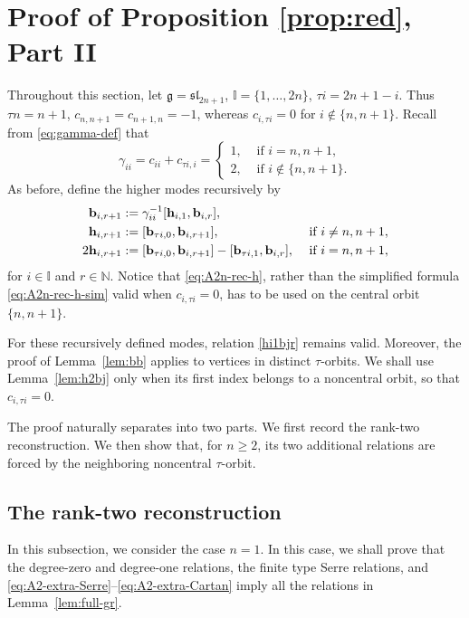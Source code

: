 \documentclass[11pt,reqno]{amsart}
\numberwithin{equation}{section}
\theoremstyle{definition}
\theoremstyle{remark}
\newcommand{\bN}{\mathbb{N}}
\newcommand{\bb}{\mathbf{b}}
\newcommand{\bh}{\mathbf{h}}
\newcommand{\g}{\mathfrak{g}}
\newcommand{\gge}{\geqslant}
\newcommand{\I}{{\mathbb I}}
\begin{document}
\section{Proof of Proposition \ref{prop:red}, Part II}\label{sec:pf-prop2}
Throughout this section, let $\g=\mathfrak{sl}_{2n+1}$, $\I=\{1,\ldots,2n\}$, $\tau i=2n+1-i$. Thus $\tau n=n+1$, $c_{n,n+1}=c_{n+1,n}=-1$, whereas $c_{i,\tau i}=0$
for $i\notin\{n,n+1\}$.
Recall from \eqref{eq:gamma-def} that
\begin{equation*}
\gamma_{ii}=c_{ii}+c_{\tau i,i}
=
\begin{cases}
1,&\text{ if }i=n,n+1,\\
2,&\text{ if }i\notin\{n,n+1\}.
\end{cases}
\end{equation*}
As before, define the higher modes recursively by
\begin{align}
\bb_{i,r+1}
&:=
\gamma_{ii}^{-1}[\bh_{i,1},\bb_{i,r}],
\notag
\\
\bh_{i,r+1}&:=[\bb_{\tau i,0},\bb_{i,r+1}], &\text{ if }i\ne n,n+1,\label{eq:A2n-rec-h-sim}\\
2\bh_{i,r+1}
&:=
[\bb_{\tau i,0},\bb_{i,r+1}]
-
[\bb_{\tau i,1},\bb_{i,r}], &\text{ if }i= n,n+1,
\label{eq:A2n-rec-h}
\end{align}
for $i\in\I$ and $r\in\bN$.  Notice that
\eqref{eq:A2n-rec-h}, rather than the simplified formula \eqref{eq:A2n-rec-h-sim} valid when
$c_{i,\tau i}=0$, has to be used on the central orbit
$\{n,n+1\}$. 

For these recursively defined modes, relation \eqref{hi1bjr}
remains valid. Moreover, the proof of Lemma~\ref{lem:bb} applies
to vertices in distinct $\tau$-orbits. We shall use
Lemma~\ref{lem:h2bj} only when its first index belongs to a
noncentral orbit, so that $c_{i,\tau i}=0$.

The proof naturally separates into two parts.  We first record the
rank-two reconstruction.  We then show that, for $n\gge2$, its two
additional relations are forced by the neighboring noncentral
$\tau$-orbit.

\subsection{The rank-two reconstruction}\label{ssec:A2-reduction}
In this subsection, we consider the case $n=1$. In this case, we shall prove that the degree-zero and degree-one relations, the
finite type Serre relations, and
\eqref{eq:A2-extra-Serre}--\eqref{eq:A2-extra-Cartan} imply all the
relations in Lemma~\ref{lem:full-gr}.
\end{document}
